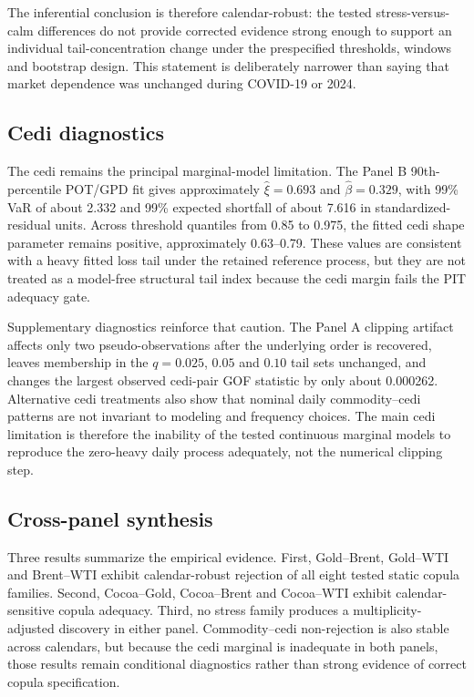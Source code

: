 The inferential conclusion is therefore calendar-robust: the tested stress-versus-calm differences do not provide corrected evidence strong enough to support an individual tail-concentration change under the prespecified thresholds, windows and bootstrap design. This statement is deliberately narrower than saying that market dependence was unchanged during COVID-19 or 2024.

\subsection{Cedi diagnostics}

The cedi remains the principal marginal-model limitation. The Panel B 90th-percentile POT/GPD fit gives approximately \(\hat\xi=0.693\) and \(\hat\beta=0.329\), with 99\% VaR of about 2.332 and 99\% expected shortfall of about 7.616 in standardized-residual units. Across threshold quantiles from 0.85 to 0.975, the fitted cedi shape parameter remains positive, approximately 0.63--0.79. These values are consistent with a heavy fitted loss tail under the retained reference process, but they are not treated as a model-free structural tail index because the cedi margin fails the PIT adequacy gate.

Supplementary diagnostics reinforce that caution. The Panel A clipping artifact affects only two pseudo-observations after the underlying order is recovered, leaves membership in the \(q=0.025\), \(0.05\) and \(0.10\) tail sets unchanged, and changes the largest observed cedi-pair GOF statistic by only about 0.000262. Alternative cedi treatments also show that nominal daily commodity--cedi patterns are not invariant to modeling and frequency choices. The main cedi limitation is therefore the inability of the tested continuous marginal models to reproduce the zero-heavy daily process adequately, not the numerical clipping step.

\subsection{Cross-panel synthesis}

Three results summarize the empirical evidence. First, Gold--Brent, Gold--WTI and Brent--WTI exhibit calendar-robust rejection of all eight tested static copula families. Second, Cocoa--Gold, Cocoa--Brent and Cocoa--WTI exhibit calendar-sensitive copula adequacy. Third, no stress family produces a multiplicity-adjusted discovery in either panel. Commodity--cedi non-rejection is also stable across calendars, but because the cedi marginal is inadequate in both panels, those results remain conditional diagnostics rather than strong evidence of correct copula specification.
